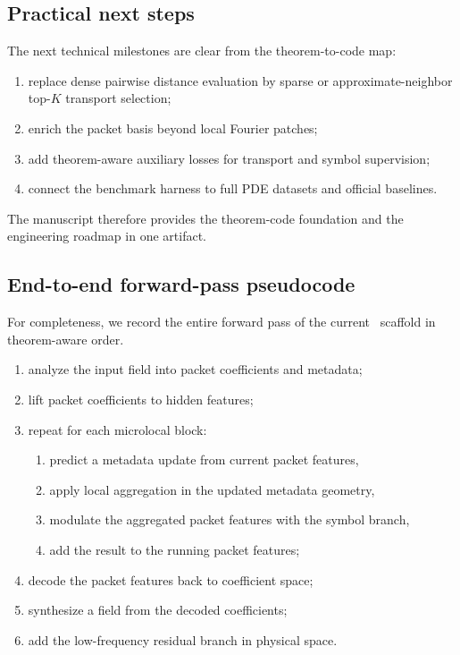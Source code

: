 \subsection{Practical next steps}

The next technical milestones are clear from the theorem-to-code map:
\begin{enumerate}
\item replace dense pairwise distance evaluation by sparse or approximate-neighbor top-$K$ transport selection;
\item enrich the packet basis beyond local Fourier patches;
\item add theorem-aware auxiliary losses for transport and symbol supervision;
\item connect the benchmark harness to full PDE datasets and official baselines.
\end{enumerate}
The manuscript therefore provides the theorem-code foundation and the engineering roadmap in one artifact.

\subsection{End-to-end forward-pass pseudocode}

For completeness, we record the entire forward pass of the current \MiNO\ scaffold in theorem-aware order.

\begin{enumerate}
\item analyze the input field into packet coefficients and metadata;
\item lift packet coefficients to hidden features;
\item repeat for each microlocal block:
\begin{enumerate}
\item predict a metadata update from current packet features,
\item apply local aggregation in the updated metadata geometry,
\item modulate the aggregated packet features with the symbol branch,
\item add the result to the running packet features;
\end{enumerate}
\item decode the packet features back to coefficient space;
\item synthesize a field from the decoded coefficients;
\item add the low-frequency residual branch in physical space.
\end{enumerate}

